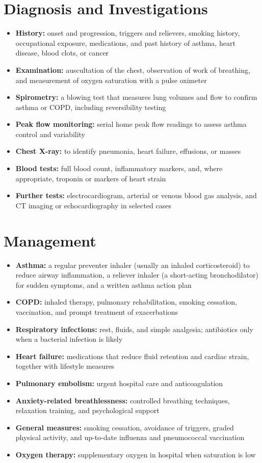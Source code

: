 \section*{Diagnosis and Investigations}
\begin{itemize}
    \item \textbf{History:} onset and progression, triggers and relievers, smoking history, occupational exposure, medications, and past history of asthma, heart disease, blood clots, or cancer
    \item \textbf{Examination:} auscultation of the chest, observation of work of breathing, and measurement of oxygen saturation with a pulse oximeter
    \item \textbf{Spirometry:} a blowing test that measures lung volumes and flow to confirm asthma or COPD, including reversibility testing
    \item \textbf{Peak flow monitoring:} serial home peak flow readings to assess asthma control and variability
    \item \textbf{Chest X-ray:} to identify pneumonia, heart failure, effusions, or masses
    \item \textbf{Blood tests:} full blood count, inflammatory markers, and, where appropriate, troponin or markers of heart strain
    \item \textbf{Further tests:} electrocardiogram, arterial or venous blood gas analysis, and CT imaging or echocardiography in selected cases
\end{itemize}

\section*{Management}
\begin{itemize}
    \item \textbf{Asthma:} a regular preventer inhaler (usually an inhaled corticosteroid) to reduce airway inflammation, a reliever inhaler (a short-acting bronchodilator) for sudden symptoms, and a written asthma action plan
    \item \textbf{COPD:} inhaled therapy, pulmonary rehabilitation, smoking cessation, vaccination, and prompt treatment of exacerbations
    \item \textbf{Respiratory infections:} rest, fluids, and simple analgesia; antibiotics only when a bacterial infection is likely
    \item \textbf{Heart failure:} medications that reduce fluid retention and cardiac strain, together with lifestyle measures
    \item \textbf{Pulmonary embolism:} urgent hospital care and anticoagulation
    \item \textbf{Anxiety-related breathlessness:} controlled breathing techniques, relaxation training, and psychological support
    \item \textbf{General measures:} smoking cessation, avoidance of triggers, graded physical activity, and up-to-date influenza and pneumococcal vaccination
    \item \textbf{Oxygen therapy:} supplementary oxygen in hospital when saturation is low
\end{itemize}

